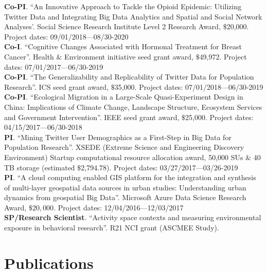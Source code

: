 \documentclass[11pt, a4paper]{article}
\newcommand{\years}[1]{\marginnote{\scriptsize #1}}
\begin{document}
\textbf{Co-PI}. ``An Innovative Approach to Tackle the Opioid Epidemic: Utilizing Twitter Data and Integrating Big Data Analytics and Spatial and Social Network Analyses'. Social Science Research Institute Level 2 Research Award, $\$$20,000. Project dates: 09/01/2018—08/30-2020\\
\textbf{Co-I}. ``Cognitive Changes Associated with Hormonal Treatment for Breast Cancer''. Health $\&$ Environment initiative seed grant award, $\$$49,972. Project dates: 07/01/2017—06/30-2019\\
\textbf{Co-PI}. ``The Generalizability and Replicability of Twitter Data for Population Research''. ICS seed grant award, $\$$35,000. Project dates: 07/01/2018—06/30-2019\\
\textbf{Co-PI}. ``Ecological Migration in a Large-Scale Quasi-Experiment Design in China: Implications of Climate Change, Landscape Structure, Ecosystem Services and Government Intervention''. IEEE seed grant award, $\$$25,000. Project dates: 04/15/2017—06/30-2018\\
\textbf{PI}. ``Mining Twitter User Demographics as a First-Step in Big Data for Population Research''. XSEDE (Extreme Science and Engineering Discovery Environment) Startup computational resource allocation award, 50,000 SUs $\&$ 40 TB storage (estimated $\$$2,794.78). Project dates: 03/27/2017—03/26-2019\\
\textbf{PI}. ``A cloud computing enabled GIS platform for the integration and synthesis of multi-layer geospatial data sources in urban studies: Understanding urban dynamics from geospatial Big Data''. Microsoft Azure Data Science Research Award, $\$20,000$. Project dates: 12/04/2016—12/03/2017\\
\textbf{SP/Research Scientist}. ``Activity space contexts and measuring environmental exposure in behavioral research''. R21 NCI grant (ASCMEE Study).

\section*{Publications}
\end{document}
